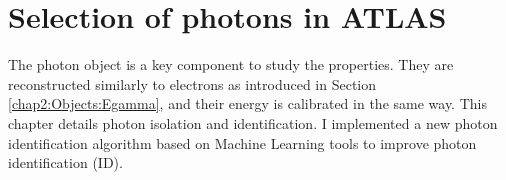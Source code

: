 \newpage
\chapter{Selection of photons in ATLAS}
\label{gamma}
The photon object is a key component to study the \HHyybb properties. They are reconstructed similarly to electrons as introduced in Section \ref{chap2:Objects:Egamma}, and their energy is calibrated in the same way. This chapter details photon isolation and identification. I implemented a new photon identification algorithm based on Machine Learning tools to improve photon identification (ID).

